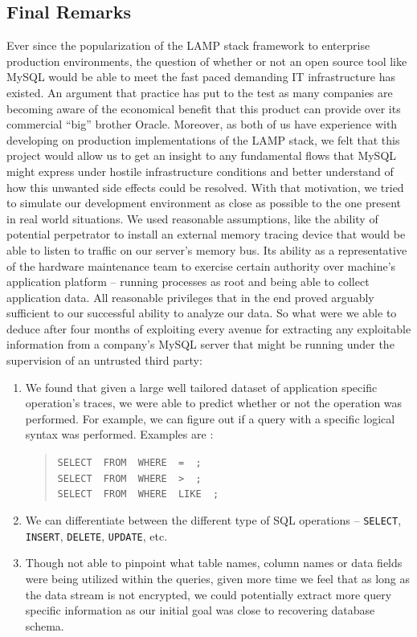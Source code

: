 \documentclass[11pt, oneside]{article}
\begin{document}
\subsection{Final Remarks}
Ever since the popularization of the LAMP stack framework to enterprise 
production environments, the question of whether or not an open source tool 
like MySQL would be able to meet the fast paced demanding IT infrastructure 
has existed. An argument that practice has put to the test as many companies 
are becoming aware of the economical benefit that this product can provide 
over its commercial “big” brother Oracle. Moreover, as both of us have 
experience with developing on production implementations of the LAMP stack, we 
felt that this project would allow us to get an insight to any fundamental 
flows that MySQL might express under hostile infrastructure conditions and 
better understand of how this unwanted side effects could be resolved. With 
that motivation, we tried to simulate our development environment as close as 
possible to the one present in real world situations. We used reasonable 
assumptions, like the ability of potential perpetrator to install an external 
memory tracing device that would be able to listen to traffic on our server's 
memory bus. Its ability as a representative of the hardware maintenance team 
to exercise certain authority over machine's application platform – running 
processes as root and being able to collect application data. All reasonable 
privileges that in the end proved arguably sufficient to our successful 
ability to analyze our data.
So what were we able to deduce after four months of exploiting every avenue 
for extracting any exploitable information from a company's MySQL server that 
might be running under the supervision of an untrusted third party:

\begin{enumerate}
\item We found that given a large well tailored dataset of application 
specific operation's traces, we were able to predict whether or not the 
operation was performed. For example, we can figure out if a query with a 
specific logical syntax was performed. Examples are :
\def\smalldash{\underbar{\hskip .3in}~}
\begin{quote}
{\tt SELECT \smalldash FROM \smalldash WHERE \smalldash = \smalldash;} \\
{\tt SELECT \smalldash FROM \smalldash WHERE \smalldash > \smalldash;} \\
{\tt SELECT \smalldash FROM \smalldash WHERE \smalldash LIKE \smalldash;}
\end{quote}
\item We can differentiate between the different type of SQL operations – 
{\tt SELECT}, {\tt INSERT}, {\tt DELETE}, {\tt UPDATE}, etc.
      
\item Though not able to pinpoint what table names, column names or data 
fields were being utilized within the queries, given more time we feel that as 
long as the data stream is not encrypted, we could potentially extract more 
query specific information as our initial goal was close to recovering 
database schema.
\end{enumerate}
\end{document}
